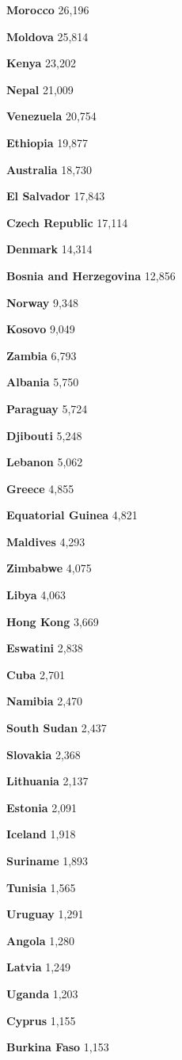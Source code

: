 \textbf{Morocco} 26,196

\textbf{Moldova} 25,814

\textbf{Kenya} 23,202

\textbf{Nepal} 21,009

\textbf{Venezuela} 20,754

\textbf{Ethiopia} 19,877

\textbf{Australia} 18,730

\textbf{El Salvador} 17,843

\textbf{Czech Republic} 17,114

\textbf{Denmark} 14,314

\textbf{Bosnia and Herzegovina} 12,856

\textbf{Norway} 9,348

\textbf{Kosovo} 9,049

\textbf{Zambia} 6,793

\textbf{Albania} 5,750

\textbf{Paraguay} 5,724

\textbf{Djibouti} 5,248

\textbf{Lebanon} 5,062

\textbf{Greece} 4,855

\textbf{Equatorial Guinea} 4,821

\textbf{Maldives} 4,293

\textbf{Zimbabwe} 4,075

\textbf{Libya} 4,063

\textbf{Hong Kong} 3,669

\textbf{Eswatini} 2,838

\textbf{Cuba} 2,701

\textbf{Namibia} 2,470

\textbf{South Sudan} 2,437

\textbf{Slovakia} 2,368

\textbf{Lithuania} 2,137

\textbf{Estonia} 2,091

\textbf{Iceland} 1,918

\textbf{Suriname} 1,893

\textbf{Tunisia} 1,565

\textbf{Uruguay} 1,291

\textbf{Angola} 1,280

\textbf{Latvia} 1,249

\textbf{Uganda} 1,203

\textbf{Cyprus} 1,155

\textbf{Burkina Faso} 1,153

